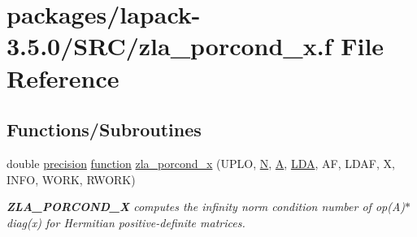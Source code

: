 \hypertarget{zla__porcond__x_8f}{}\section{packages/lapack-\/3.5.0/\+S\+R\+C/zla\+\_\+porcond\+\_\+x.f File Reference}
\label{zla__porcond__x_8f}
\subsection*{Functions/\+Subroutines}
\begin{DoxyCompactItemize}
\item 
double \hyperlink{numinquire_8h_a2c8e616467665d0b2814d4c1589ba74e}{precision} \hyperlink{afunc_8m_a7b5e596df91eadea6c537c0825e894a7}{function} \hyperlink{group__complex16POcomputational_gaf05af329082dde43c21a1a2cde6d8c54}{zla\+\_\+porcond\+\_\+x} (U\+P\+L\+O, \hyperlink{polmisc_8c_a0240ac851181b84ac374872dc5434ee4}{N}, \hyperlink{classA}{A}, \hyperlink{example__user_8c_ae946da542ce0db94dced19b2ecefd1aa}{L\+D\+A}, A\+F, L\+D\+A\+F, X, I\+N\+F\+O, W\+O\+R\+K, R\+W\+O\+R\+K)
\begin{DoxyCompactList}\small\item\em {\bfseries Z\+L\+A\+\_\+\+P\+O\+R\+C\+O\+N\+D\+\_\+\+X} computes the infinity norm condition number of op(\+A)$\ast$diag(x) for Hermitian positive-\/definite matrices. \end{DoxyCompactList}\end{DoxyCompactItemize}
